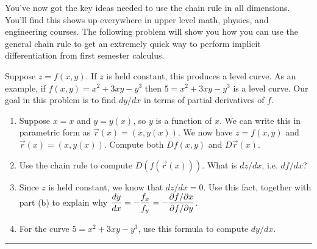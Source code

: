 You've now got the key ideas needed to use the chain rule in all dimensions. You'll find this shows up everywhere in upper level math, physics, and engineering courses. The following problem will show you how you can use the general chain rule to get an extremely quick way to perform implicit differentiation from first semester calculus.

\begin{problem}%
 Suppose $z=f(x,y)$.  If $z$ is held constant, this produces a level curve. As an example, if $f(x,y) = x^2+3xy-y^3$ then $5=x^2+3xy-y^3$ is a level curve. Our goal in this problem is to find $dy/dx$ in terms of partial derivatives of $f$.
\begin{enumerate}
 \item Suppose $x=x$ and $y=y(x)$, so $y$ is a function of $x$.  We can write this in parametric form as $\vec r(x) = (x,y(x))$. We now have $z=f(x,y)$ and $\vec r(x)=(x,y(x))$.  Compute both $Df(x,y)$ and $D\vec r(x)$. 
 \item Use the chain rule to compute $D(f(\vec r(x)))$. What is $dz/dx$, i.e. $df/dx$?
 \item Since $z$ is held constant, we know that $dz/dx=0$. Use this fact, together with part (b) to explain why $\displaystyle \frac{dy}{dx} = -\frac{f_x}{f_y} = -\frac{\partial f/ \partial x}{\partial f/ \partial y}$.
 \item For the curve $5=x^2+3xy-y^3$, use this formula to compute $dy/dx$.
\end{enumerate}
  
\hrule\end{problem}



